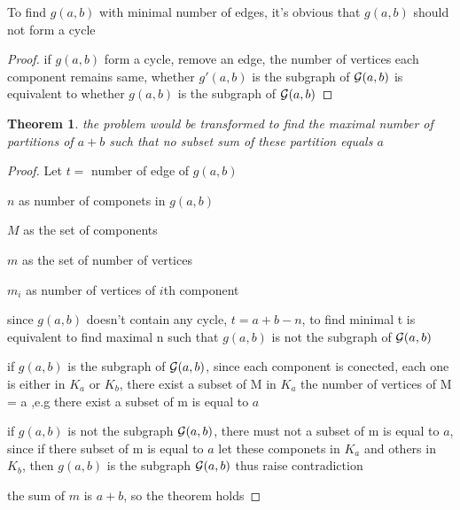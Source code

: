 \documentclass[12pt,a4paper]{article}
\title{}
\author{}
\newtheorem{theorem}{Theorem}
\begin{document}
\noindent
To find $g(a,b)$ with minimal number of edges, it's obvious that $g(a,b)$ should not form a cycle

\begin{proof} 
if $g(a,b)$ form a cycle, remove an edge, the number of vertices each component remains same, whether $g'(a,b)$ is the subgraph of ${\cal G}(a,b)$ is equivalent to whether $g(a,b)$ is the subgraph of ${\cal G}(a,b)$
\end{proof}

\begin{theorem}

the problem would be transformed to find the maximal number of partitions of $a+b$ such that no subset sum of these partition equals $a$

\end{theorem}

\begin{proof} 
Let $t =$ number of edge of $g(a,b)$

$n$ as number of componets in $g(a,b)$

$M$ as the set of components

$m$ as the set of number of vertices

$m_i$  as number of vertices of $i$th component

since $g(a,b)$ doesn't contain any cycle, $t = a+b - n$, to find minimal t is equivalent to find maximal n such that $g(a,b)$ is not the subgraph of ${\cal G}(a,b)$

if $g(a,b)$ is the subgraph of ${\cal G}(a,b)$, 
since each component is conected, each one is either in $K_a$ or $K_b$, there exist a subset of M in $K_a$ the number of vertices of M = a
,e.g there exist a subset of m is equal to $a$

if $g(a,b)$ is not the subgraph ${\cal G}(a,b)$, there must not a subset of m is equal to $a$, since if there subset of m is equal to $a$ let these componets in $K_a$ and others in $K_b$, then $g(a,b)$ is the subgraph ${\cal G}(a,b)$ thus raise contradiction


the sum of $m$ is $a+b$, so the theorem holds

\end{proof}
\end{document}

